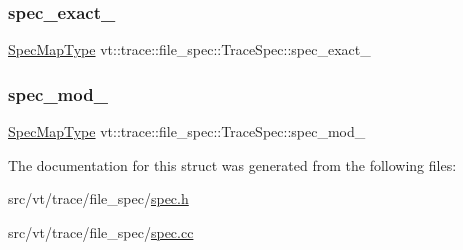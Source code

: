 \subsubsection{\texorpdfstring{spec\+\_\+exact\+\_\+}{spec\_exact\_}}
{\footnotesize\ttfamily \hyperlink{structvt_1_1trace_1_1file__spec_1_1_trace_spec_a155d6b881e8d69a4644823789788ce5c}{Spec\+Map\+Type} vt\+::trace\+::file\+\_\+spec\+::\+Trace\+Spec\+::spec\+\_\+exact\+\_\+\hspace{0.3cm}{\ttfamily [private]}}

\mbox{\label{structvt_1_1trace_1_1file__spec_1_1_trace_spec_aae4873bc7f4d6ae6c33098670c8a550e}} 
\subsubsection{\texorpdfstring{spec\+\_\+mod\+\_\+}{spec\_mod\_}}
{\footnotesize\ttfamily \hyperlink{structvt_1_1trace_1_1file__spec_1_1_trace_spec_a155d6b881e8d69a4644823789788ce5c}{Spec\+Map\+Type} vt\+::trace\+::file\+\_\+spec\+::\+Trace\+Spec\+::spec\+\_\+mod\+\_\+\hspace{0.3cm}{\ttfamily [private]}}



The documentation for this struct was generated from the following files\+:\begin{DoxyCompactItemize}
\item 
src/vt/trace/file\+\_\+spec/\hyperlink{spec_8h}{spec.\+h}\item 
src/vt/trace/file\+\_\+spec/\hyperlink{spec_8cc}{spec.\+cc}\end{DoxyCompactItemize}
